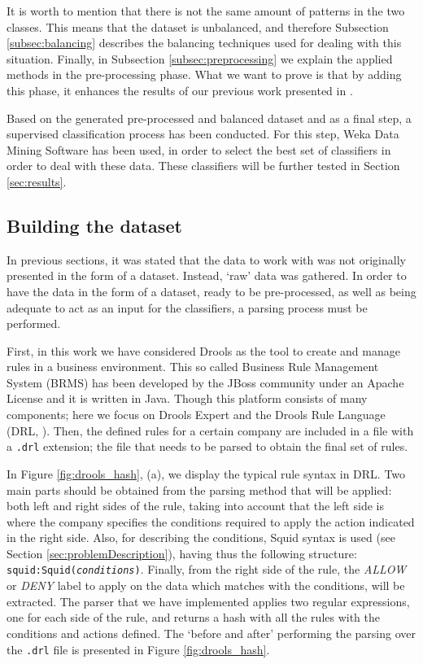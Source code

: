 \documentclass{llncs}
\begin{document}
It is worth to mention that there is not the same amount of patterns in the two classes. This means that the dataset is unbalanced, and therefore Subsection \ref{subsec:balancing} describes the balancing techniques used for dealing with this situation. Finally, in Subsection \ref{subsec:preprocessing} we explain the applied methods in the pre-processing phase. What we want to prove is that by adding this phase, it enhances the results of our previous work presented in \cite{ECTA}.

Based on the generated pre-processed and balanced dataset and as a final step, a supervised classification process \cite{classification_67} has been conducted. For this step, Weka Data Mining Software\cite{weka:site} has been used, in order to select the best set of classifiers in order to deal with these data. These classifiers will be further tested in Section \ref{sec:results}.

%
\subsection{Building the dataset}
\label{sec:buldingdataset}

In previous sections, it was stated that the data to work with was not originally presented in the form of a dataset. Instead, `raw' data was gathered. In order to have the data in the form of a dataset, ready to be pre-processed, as well as being adequate to act as an input for the classifiers, a parsing process must be performed.

First, in this work we have considered Drools \cite{drools:site} as the tool to create and  manage rules in a business environment. This so called Business Rule Management System (BRMS) has been developed by the JBoss community under an Apache License and it is written in Java. Though this platform consists of many components; here we focus on Drools Expert and the Drools Rule Language (DRL, \cite{drools:doc}). Then, the defined rules for a certain company are included in a file with a \texttt{.drl} extension; the file that needs to be parsed to obtain the final set of rules.

In Figure \ref{fig:drools_hash}, (a), we display the typical rule syntax in DRL. Two main parts should be obtained from the parsing method that will be applied: both left and right sides of the rule, taking into account that the left side is where the company specifies the conditions required to apply the action indicated in the right side. Also, for describing the conditions, Squid syntax is used (see Section \ref{sec:problemDescription}), having thus the following structure: \texttt{squid:Squid(\textit{conditions})}. Finally, from the right side of the rule, the \textit{ALLOW} or \textit{DENY} label to apply on the data which matches with the conditions, will be extracted.
The parser that we have implemented applies two regular
expressions, one for each side of the rule, and returns a hash with
all the rules with the conditions and actions defined. The `before and
after' performing the parsing over the \texttt{.drl} file is presented
in Figure \ref{fig:drools_hash}.
\end{document}
